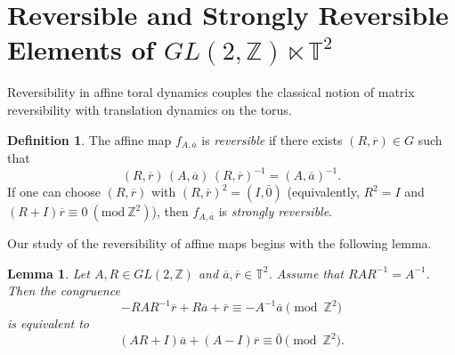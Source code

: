 \documentclass[12pt]{amsart}
\theoremstyle{plain}
\newtheorem{lemma}[theorem]{Lemma}
\theoremstyle{definition}
\newtheorem{definition}[theorem]{Definition}
\theoremstyle{remark}
\begin{document}




\section{Reversible and Strongly Reversible Elements of $GL(2,\mathbb{Z})\ltimes \mathbb{T}^{2}$}\label{affine}

Reversibility in affine toral dynamics couples the classical notion of matrix reversibility with translation dynamics on the torus. 


\begin{definition}
The affine map \(f_{A,\overline{a}}\) is \emph{reversible} if there exists \((R,\overline{r})\in G\) such that
$$
(R,\overline{r})\, (A,\overline{a})\, (R,\overline{r})^{-1}=(A,\overline{a})^{-1}.
$$
If one can choose \((R,\overline{r})\) with \((R,\overline{r})^2=(I,\bar{0})\) (equivalently, \(R^2=I\) and \((R+I)\overline{r}\equiv 0~ (\text{mod}~\mathbb{Z}^2)\)),
then \(f_{A,\overline{a}}\) is \emph{strongly reversible}.
\end{definition}

Our study of the reversibility of affine maps begins with the following lemma.

\begin{lemma}
Let $A,R \in GL(2, \mathbb Z)$ and $\overline{a},\overline{r} \in \mathbb T^2 $.
Assume that $RAR^{-1} = A^{-1}$. 
Then the congruence
\begin{equation}\label{eq}
- R A R^{-1} \overline{r} + R\overline{a} + \overline{r} \equiv -A^{-1} \overline{a} \pmod{\mathbb Z^2}
\end{equation}
is equivalent to
\begin{equation}\label{eq2}
(AR+I)\overline{a} + (A-I)\overline{r} \equiv \bar{0} \pmod{\mathbb Z^2}.
\end{equation}
\end{lemma}
\end{document}
